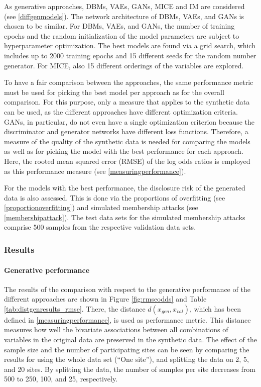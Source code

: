 \documentclass[12pt]{article}
\begin{document}
As generative approaches, DBMs, VAEs, GANs, MICE and IM are considered (see \ref{diffgenmodels}).
The network architecture of DBMs, VAEs, and GANs is chosen to be similar.
For DBMs, VAEs, and GANs, the number of training epochs and the random initialization of the model parameters are subject to hyperparameter optimization.
The best models are found via a grid search, which includes up to 2000 training epochs and 15 different seeds for the random number generator.
For MICE, also 15 different orderings of the variables are explored.

To have a fair comparison between the approaches, the same performance metric must be used for picking the best model per approach as for the overall comparison.
For this purpose, only a measure that applies to the synthetic data can be used, as the different approaches have different optimization criteria.
GANs, in particular, do not even have a single optimization criterion because the discriminator and generator networks have different loss functions.
Therefore, a measure of the quality of the synthetic data is needed for comparing the models as well as for picking the model with the best performance for each approach.
Here, the rooted mean squared error (RMSE) of the log odds ratios is employed as this performance measure (see \ref{measuringperformance}).

For the models with the best performance, the disclosure risk of the generated data is also assessed.
This is done via the proportions of overfitting (see \ref{proportionoverfitting}) and simulated membership attacks (see \ref{membershipattack}).
The test data sets for the simulated membership attacks comprise 500 samples from the respective validation data sets.

\FloatBarrier
\subsubsection{Results}\label{realexpresults}

\paragraph{Generative performance}
The results of the comparison with respect to the generative performance of the different approaches are shown in Figure \ref{fig:rmseodds} and Table \ref{tab:distgenresults_rmse}.
There, the distance $d(x_{gen},x_{val})$, which has been defined in \ref{measuringperformance}, is used as performance metric.
This distance measures how well the bivariate associations between all combinations of variables in the original data are preserved in the synthetic data.
The effect of the sample size and the number of participating sites can be seen by comparing the results for using the whole data set (``One site''), and splitting the data on 2, 5, and 20 sites.
By splitting the data, the number of samples per site decreases from 500 to 250, 100, and 25, respectively.
\end{document}
